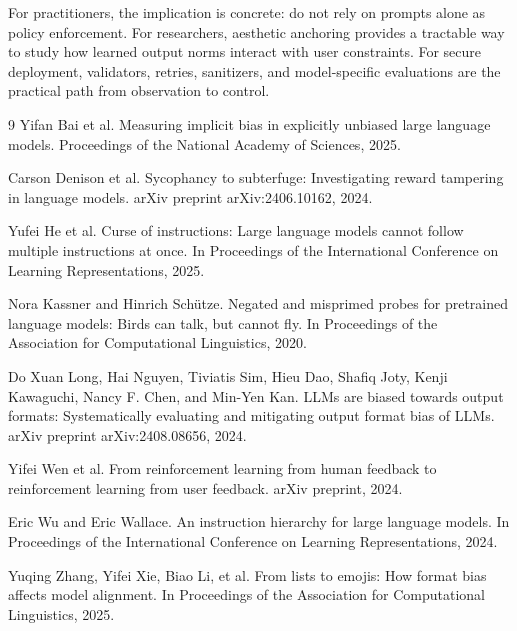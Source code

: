 \documentclass[runningheads,a4paper]{llncs}
\begin{document}
For practitioners, the implication is concrete: do not rely on prompts alone as policy enforcement. For researchers, aesthetic anchoring provides a tractable way to study how learned output norms interact with user constraints. For secure deployment, validators, retries, sanitizers, and model-specific evaluations are the practical path from observation to control.

\begin{thebibliography}{9}
Yifan Bai et al.
Measuring implicit bias in explicitly unbiased large language models.
Proceedings of the National Academy of Sciences, 2025.

Carson Denison et al.
Sycophancy to subterfuge: Investigating reward tampering in language models.
arXiv preprint arXiv:2406.10162, 2024.

Yufei He et al.
Curse of instructions: Large language models cannot follow multiple instructions at once.
In Proceedings of the International Conference on Learning Representations, 2025.

Nora Kassner and Hinrich Sch{\"u}tze.
Negated and misprimed probes for pretrained language models: Birds can talk, but cannot fly.
In Proceedings of the Association for Computational Linguistics, 2020.

Do Xuan Long, Hai Nguyen, Tiviatis Sim, Hieu Dao, Shafiq Joty, Kenji Kawaguchi, Nancy F. Chen, and Min-Yen Kan.
LLMs are biased towards output formats: Systematically evaluating and mitigating output format bias of LLMs.
arXiv preprint arXiv:2408.08656, 2024.

Yifei Wen et al.
From reinforcement learning from human feedback to reinforcement learning from user feedback.
arXiv preprint, 2024.

Eric Wu and Eric Wallace.
An instruction hierarchy for large language models.
In Proceedings of the International Conference on Learning Representations, 2024.

Yuqing Zhang, Yifei Xie, Biao Li, et al.
From lists to emojis: How format bias affects model alignment.
In Proceedings of the Association for Computational Linguistics, 2025.
\end{thebibliography}
\end{document}
